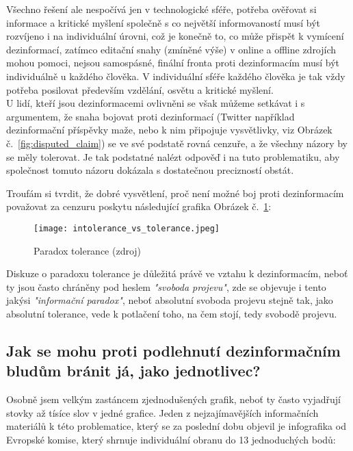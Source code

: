 Všechno řešení ale nespočívá jen v technologické sféře, potřeba ověřovat si informace a kritické myšlení společně s co největší informovaností musí být rozvíjeno i na individuální úrovni, což je konečně to, co může přispět k vymícení dezinformací, zatímco editační snahy (zmíněné výše) v online a offline zdrojích mohou pomoci, nejsou samospásné, finální fronta proti dezinformacím musí být individuálně u každého člověka. V individuální sféře každého člověka je tak vždy potřeba posilovat především vzdělání, osvětu a kritické myšlení.\\

U lidí, kteří jsou dezinformacemi ovlivněni se však můžeme setkávat i s argumentem, že snaha bojovat proti dezinformací (Twitter například dezinformační příspěvky maže, nebo k nim připojuje vysvětlivky, viz Obrázek č.~\ref{fig:disputed_claim}) se ve své podstatě rovná cenzuře, a že všechny názory by se měly tolerovat. Je tak podstatné nalézt odpověď i na tuto problematiku, aby společnost tomuto názoru dokázala s dostatečnou precizností obstát.\\

\newpage

Troufám si tvrdit, že dobré vysvětlení, proč není možné boj proti dezinformacím považovat za cenzuru poskytu následující grafika Obrázek č.~\ref{fig:tolerance_paradox}:\\

\begin{figure}[htbp]
  \centering
  \texttt{[image: intolerance\_vs\_tolerance.jpeg]}
  \caption{Paradox tolerance (zdroj)}
  \label{fig:tolerance_paradox}
\end{figure}

Diskuze o paradoxu tolerance je důležitá právě ve vztahu k dezinformacím, neboť ty jsou často chráněny pod heslem \textit{"svoboda projevu"}, zde se objevuje i tento jakýsi \textit{"informační paradox"}, neboť absolutní svoboda projevu stejně tak, jako absolutní tolerance, vede k potlačení toho, na čem stojí, tedy svobodě projevu.\\

\subsection{Jak se mohu proti podlehnutí dezinformačním bludům bránit já, jako jednotlivec?}

Osobně jsem velkým zastáncem zjednodušených grafik, neboť ty často vyjadřují stovky až tísíce slov v jedné grafice. Jeden z nejzajímavějších informačních materiálů k této problematice, který se za poslední dobu objevil je infografika od Evropské komise, který shrnuje individuální obranu do 13 jednoduchých bodů:\\

